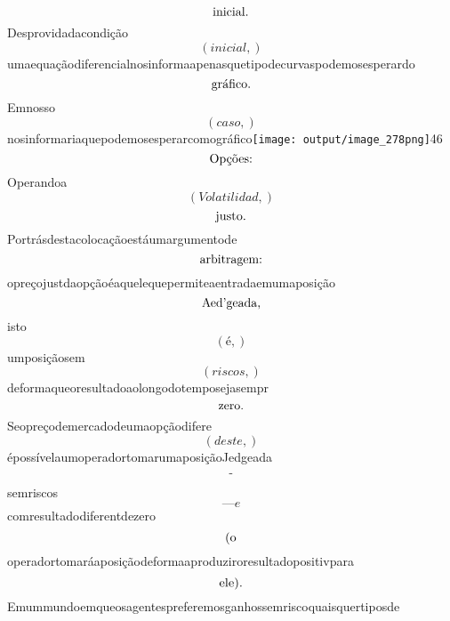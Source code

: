 \documentclass{article}
\begin{document}
\begin{equation}
$inicial.$
\end{equation}Desprovidadacondição\begin{equation}
\left( inicial,\right)
\end{equation}umaequaçãodiferencialnosinformaapenasquetipodecurvaspodemosesperardo\begin{equation}
$gráfico.$
\end{equation}Emnosso\begin{equation}
\left( caso,\right)
\end{equation}nosinformariaquepodemosesperarcomográfico\texttt{[image: output/image\_278png]}46\begin{equation}
$Opções:$
\end{equation}Operandoa\begin{equation}
\left( Volatilidad,\right)
\end{equation}\begin{equation}
$justo.$
\end{equation}Portrásdestacolocaçãoestáumargumentode\begin{equation}
$arbitragem:$
\end{equation}opreçojustdaopçãoéaquelequepermiteaentradaemumaposição\begin{equation}
$Aed'geada,$
\end{equation}isto\begin{equation}
\left( é,\right)
\end{equation}umposiçãosem\begin{equation}
\left( riscos,\right)
\end{equation}deformaqueoresultadoaolongodotemposejasempr\begin{equation}
$zero.$
\end{equation}Seopreçodemercadodeumaopçãodifere\begin{equation}
\left( deste,\right)
\end{equation}épossívelaumoperadortomarumaposiçãoJedgeada\begin{equation}
$-$
\end{equation}semriscos\begin{equation}
—e
\end{equation}comresultadodiferentdezero\begin{equation}
$(o$
\end{equation}operadortomaráaposiçãodeformaaproduziroresultadopositivpara\begin{equation}
$ele).$
\end{equation}Emummundoemqueosagentespreferemosganhossemriscoquaisquertiposde\begin{equation}

\end{equation}
\end{document}
